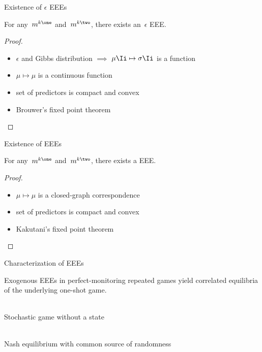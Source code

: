 \begin{frame}{Existence of \(\epsilon\) EEEs}

\begin{theorem}
For any~\(m^{k\one}\) and~\(m^{k\two}\), there exists an~\(\epsilon\) EEE.
\end{theorem}

\pause

\begin{proof}
\begin{itemize}
\item \(\epsilon\) and Gibbs distribution \(\implies\) \(\mu\Ii \mapsto \sigma\Ii\) is a function
\item \(\mu \mapsto \mu\) is a continuous function
\item set of predictors is compact and convex
\item Brouwer's fixed point theorem
\end{itemize}
\end{proof}

\end{frame}
\begin{frame}{Existence of EEEs \newinthesis}

\begin{theorem}
For any~\(m^{k\one}\) and~\(m^{k\two}\), there exists a EEE.
\end{theorem}

\pause

\begin{proof}
\begin{itemize}
\item \(\mu \mapsto \mu\) is a closed-graph correspondence
\item set of predictors is compact and convex
\item Kakutani's fixed point theorem
\end{itemize}
\end{proof}
\end{frame}
\begin{frame}{Characterization of EEEs \newinthesis}
\begin{theorem}
Exogenous EEEs in perfect-monitoring repeated games yield correlated equilibria of the underlying one-shot game.
\end{theorem}

\bigskip\bigskip

\\
\qquad Stochastic game without a state

\medskip
{}\\
\qquad Nash equilibrium with common source of randomness

\end{frame}
